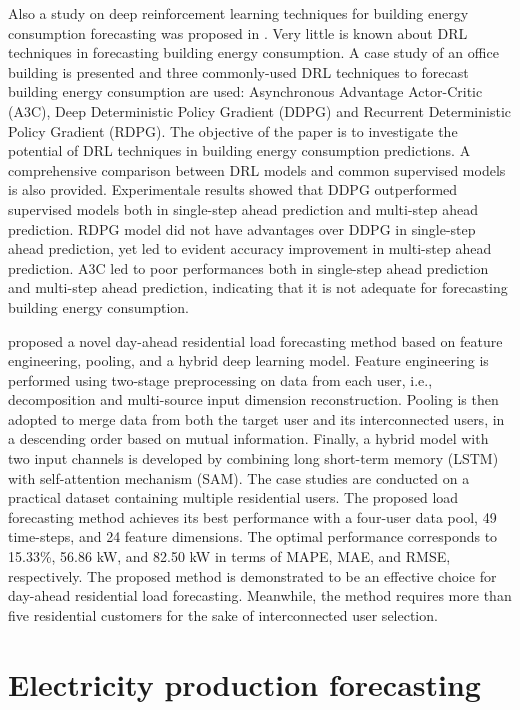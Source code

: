 Also a study on deep reinforcement learning techniques for building energy consumption forecasting was proposed in \cite{LIU2020109675}.
Very little is known about DRL techniques in forecasting building energy consumption.
A case study of an office building is presented and three commonly-used DRL techniques to forecast building energy consumption are used: Asynchronous Advantage Actor-Critic (A3C), Deep Deterministic Policy Gradient (DDPG) and Recurrent Deterministic Policy Gradient (RDPG).
The objective of the paper is to investigate the potential of DRL techniques in building energy consumption predictions.
A comprehensive comparison between DRL models and common supervised models is also provided.
Experimentale results showed that DDPG outperformed supervised models both in single-step ahead prediction and multi-step ahead prediction.
RDPG model did not have advantages over DDPG in single-step ahead prediction, yet led to evident accuracy improvement in multi-step ahead prediction.
A3C led to poor performances both in single-step ahead prediction and multi-step ahead prediction, indicating that it is not adequate for forecasting building energy consumption.

\cite{ZANG2021120682} proposed a novel day-ahead residential load forecasting method based on feature engineering, pooling, and a hybrid deep learning model.
Feature engineering is performed using two-stage preprocessing on data from each user, i.e., decomposition and multi-source input dimension reconstruction.
Pooling is then adopted to merge data from both the target user and its interconnected users, in a descending order based on mutual information.
Finally, a hybrid model with two input channels is developed by combining long short-term memory (LSTM) with self-attention mechanism (SAM).
The case studies are conducted on a practical dataset containing multiple residential users.
The proposed load forecasting method achieves its best performance with a four-user data pool, 49 time-steps, and 24 feature dimensions.
The optimal performance corresponds to 15.33\%, 56.86 kW, and 82.50 kW in terms of MAPE, MAE, and RMSE, respectively.
The proposed method is demonstrated to be an effective choice for day-ahead residential load forecasting. Meanwhile, the method requires more than five residential customers for the sake of interconnected user selection.


\section{Electricity production forecasting}
\label{sec:productionsoa}
\vspace{0.2 cm}

